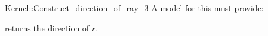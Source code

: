 \begin{ccRefFunctionObjectConcept}{Kernel::Construct_direction_of_ray_3}
A model for this must provide:


       {returns the direction of $r$.}


\end{ccRefFunctionObjectConcept}
